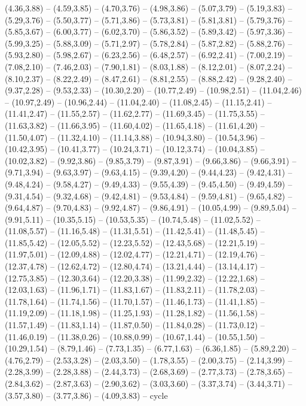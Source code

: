{  (4.36,3.88) -- (4.59,3.85) -- (4.70,3.76) -- (4.98,3.86) -- (5.07,3.79) -- (5.19,3.83) -- (5.29,3.76) -- (5.50,3.77) -- (5.71,3.86) -- (5.73,3.81) -- (5.81,3.81) -- (5.79,3.76) -- (5.85,3.67) -- (6.00,3.77) -- (6.02,3.70) -- (5.86,3.52) -- (5.89,3.42) -- (5.97,3.36) -- (5.99,3.25) -- (5.88,3.09) -- (5.71,2.97) -- (5.78,2.84) -- (5.87,2.82) -- (5.88,2.76) -- (5.93,2.80) -- (5.98,2.67) -- (6.23,2.56) -- (6.48,2.57) -- (6.92,2.41) -- (7.00,2.19) -- (7.08,2.10) -- (7.46,2.03) -- (7.90,1.81) -- (8.03,1.88) -- (8.12,2.01) -- (8.07,2.24) -- (8.10,2.37) -- (8.22,2.49) -- (8.47,2.61) -- (8.81,2.55) -- (8.88,2.42) -- (9.28,2.40) -- (9.37,2.28) -- (9.53,2.33) -- (10.30,2.20) -- (10.77,2.49) -- (10.98,2.51) -- (11.04,2.46) -- (10.97,2.49) -- (10.96,2.44) -- (11.04,2.40) -- (11.08,2.45) -- (11.15,2.41) -- (11.41,2.47) -- (11.55,2.57) -- (11.62,2.77) -- (11.69,3.45) -- (11.75,3.55) -- (11.63,3.82) -- (11.66,3.95) -- (11.60,4.02) -- (11.65,4.18) -- (11.61,4.20) -- (11.50,4.07) -- (11.32,4.10) -- (11.14,3.88) -- (10.94,3.80) -- (10.54,3.96) -- (10.42,3.95) -- (10.41,3.77) -- (10.24,3.71) -- (10.12,3.74) -- (10.04,3.85) -- (10.02,3.82) -- (9.92,3.86) -- (9.85,3.79) -- (9.87,3.91) -- (9.66,3.86) -- (9.66,3.91) -- (9.71,3.94) -- (9.63,3.97) -- (9.63,4.15) -- (9.39,4.20) -- (9.44,4.23) -- (9.42,4.31) -- (9.48,4.24) -- (9.58,4.27) -- (9.49,4.33) -- (9.55,4.39) -- (9.45,4.50) -- (9.49,4.59) -- (9.31,4.54) -- (9.32,4.68) -- (9.42,4.81) -- (9.53,4.84) -- (9.59,4.81) -- (9.65,4.82) -- (9.64,4.87) -- (9.70,4.83) -- (9.92,4.87) -- (9.86,4.91) -- (10.05,4.99) -- (9.89,5.04) -- (9.91,5.11) -- (10.35,5.15) -- (10.53,5.35) -- (10.74,5.48) -- (11.02,5.52) -- (11.08,5.57) -- (11.16,5.48) -- (11.31,5.51) -- (11.42,5.41) -- (11.48,5.45) -- (11.85,5.42) -- (12.05,5.52) -- (12.23,5.52) -- (12.43,5.68) -- (12.21,5.19) -- (11.97,5.01) -- (12.09,4.88) -- (12.02,4.77) -- (12.21,4.71) -- (12.19,4.76) -- (12.37,4.78) -- (12.62,4.72) -- (12.80,4.74) -- (13.21,4.44) -- (13.14,4.17) -- (12.75,3.85) -- (12.30,3.64) -- (12.20,3.38) -- (11.99,2.32) -- (12.22,1.68) -- (12.03,1.63) -- (11.96,1.71) -- (11.83,1.67) -- (11.83,2.11) -- (11.78,2.03) -- (11.78,1.64) -- (11.74,1.56) -- (11.70,1.57) -- (11.46,1.73) -- (11.41,1.85) -- (11.19,2.09) -- (11.18,1.98) -- (11.25,1.93) -- (11.28,1.82) -- (11.56,1.58) -- (11.57,1.49) -- (11.83,1.14) -- (11.87,0.50) -- (11.84,0.28) -- (11.73,0.12) -- (11.46,0.19) -- (11.38,0.26) -- (10.88,0.99) -- (10.67,1.44) -- (10.55,1.50) -- (10.29,1.54) -- (8.79,1.46) -- (7.73,1.35) -- (6.77,1.63) -- (6.36,1.85) -- (5.89,2.20) -- (4.76,2.79) -- (2.53,3.28) -- (2.03,3.50) -- (1.78,3.55) -- (2.00,3.75) -- (2.14,3.99) -- (2.28,3.99) -- (2.28,3.88) -- (2.44,3.73) -- (2.68,3.69) -- (2.77,3.73) -- (2.78,3.65) -- (2.84,3.62) -- (2.87,3.63) -- (2.90,3.62) -- (3.03,3.60) -- (3.37,3.74) -- (3.44,3.71) -- (3.57,3.80) -- (3.77,3.86) -- (4.09,3.83) -- cycle
}
